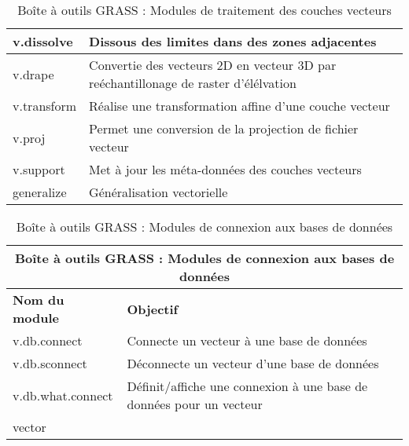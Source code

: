 \begin{table}[H]
{\begin{longtable}{|p{2.5cm}|p{11.5cm}|}
  \hline v.dissolve & Dissous des limites dans des zones adjacentes\\
  \hline v.drape & Convertie des vecteurs 2D en vecteur 3D par reéchantillonage de raster d'élélvation\\
  \hline v.transform & Réalise une transformation affine d'une couche vecteur\\
  \hline v.proj & Permet une conversion de la projection de fichier vecteur\\
  \hline v.support & Met à jour les méta-données des couches vecteurs\\
  \hline generalize & Généralisation vectorielle\\ 
\hline
\end{longtable}}
\caption{Boîte à outils GRASS : Modules de traitement des couches vecteurs}
\end{table}



\begin{table}[H]
\centering
 \begin{tabular}{|p{4cm}|p{10cm}|}
  \hline \multicolumn{2}{|c|}{\textbf{Boîte à outils GRASS : Modules de connexion aux bases de données}} \\
  \hline \textbf{Nom du module} & \textbf{Objectif} \\
  \hline v.db.connect & Connecte un vecteur à une base de données\\
  \hline v.db.sconnect & Déconnecte un vecteur d'une base de données\\
  \hline v.db.what.connect & Définit/affiche une connexion à une base de données pour un vecteur\\ vector \\
\hline
\end{tabular}
\caption{Boîte à outils GRASS : Modules de connexion aux bases de données}
\end{table}

